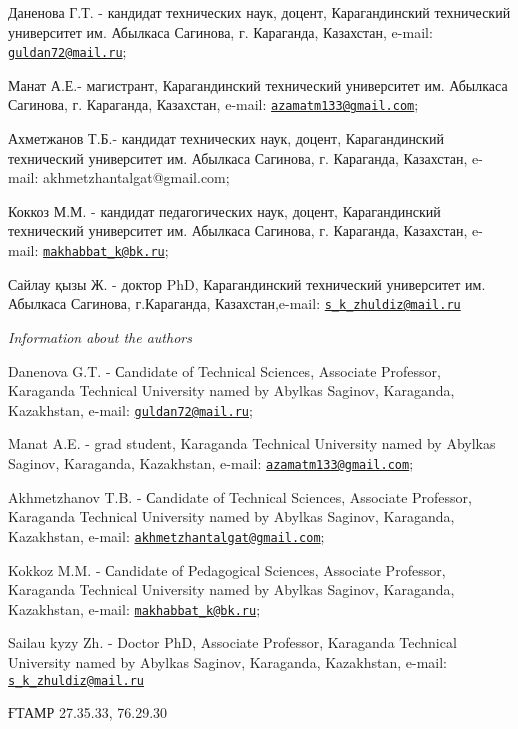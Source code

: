 \documentclass[
]{article}
\begin{document}
Даненова Г.Т. - кандидат технических наук, доцент, Карагандинский
технический университет им. Абылкаса Сагинова, г. Караганда, Казахстан,
e-mail: \href{mailto:guldan72@mail.ru}{\nolinkurl{guldan72@mail.ru}};

Манат А.Е.- магистрант, Карагандинский технический университет им.
Абылкаса Сагинова, г. Караганда, Казахстан, e-mail:
\href{mailto:azamatm133@gmail.com}{\nolinkurl{azamatm133@gmail.com}};

Ахметжанов Т.Б.- кандидат технических наук, доцент, Карагандинский
технический университет им. Абылкаса Сагинова, г. Караганда, Казахстан,
e-mail: akhmetzhantalgat@gmail.com;

Коккоз М.М. - кандидат педагогических наук, доцент, Карагандинский
технический университет им. Абылкаса Сагинова, г. Караганда, Казахстан,
e-mail: \href{mailto:makhabbat_k@bk.ru}{\nolinkurl{makhabbat\_k@bk.ru}};

Сайлау қызы Ж. - доктор PhD, Карагандинский технический университет им.
Абылкаса Сагинова, г.Караганда, Казахстан,e-mail:
\href{mailto:s_k_zhuldiz@mail.ru}{\nolinkurl{s\_k\_zhuldiz@mail.ru}}

\emph{Information about the authors}

Danenova G.T. - Сandidate of Technical Sciences, Associate Professor,
Karaganda Technical University named by Abylkas Saginov, Karaganda,
Kazakhstan, e-mail:
\href{mailto:guldan72@mail.ru}{\nolinkurl{guldan72@mail.ru}};

Manat A.E. - grad student, Karaganda Technical University named by
Abylkas Saginov, Karaganda, Kazakhstan, e-mail:
\href{mailto:azamatm133@gmail.com}{\nolinkurl{azamatm133@gmail.com}};

Akhmetzhanov T.B. - Сandidate of Technical Sciences, Associate
Professor, Karaganda Technical University named by Abylkas Saginov,
Karaganda, Kazakhstan, e-mail:
\href{mailto:akhmetzhantalgat@gmail.com}{\nolinkurl{akhmetzhantalgat@gmail.com}};

Kokkoz M.M. - Сandidate of Pedagogical Sciences, Associate Professor,
Karaganda Technical University named by Abylkas Saginov, Karaganda,
Kazakhstan, e-mail:
\href{mailto:makhabbat_k@bk.ru}{\nolinkurl{makhabbat\_k@bk.ru}};

Sailau kyzy Zh. - Doctor PhD, Associate Professor, Karaganda Technical
University named by Abylkas Saginov, Karaganda, Kazakhstan, e-mail:
\href{mailto:s_k_zhuldiz@mail.ru}{\nolinkurl{s\_k\_zhuldiz@mail.ru}}

ҒТАМР 27.35.33, 76.29.30
\end{document}
